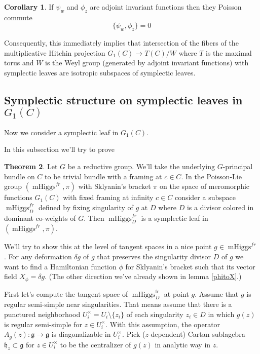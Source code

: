 \documentclass[11pt, oneside, reqno]{amsart}
\theoremstyle{definition} \newtheorem{definition}{Definition}[section]
\newtheorem{theorem}[definition]{Theorem}
\newtheorem{corollary}[definition]{Corollary}
\theoremstyle{definition} \newtheorem{remark}[definition]{Remark}
\theoremstyle{definition} \newtheorem{remarks}[definition]{Remarks}
\theoremstyle{definition} \newtheorem{question}[definition]{Question}
\theoremstyle{definition} \newtheorem*{note}{Note}
\theoremstyle{definition} \newtheorem{example}[definition]{Example}
\theoremstyle{definition} \newtheorem{examples}[definition]{Examples}
\renewcommand{\gg}{\mathfrak{g}}
\DeclareMathOperator{\mhiggs}{mHiggs}
\newcommand{\fr}{\mathrm{fr}}
\begin{document}
\begin{corollary}\label{cor:poisson-commuting}
  If $\psi_{w}$ and $\phi_{z}$ are adjoint invariant functions then they Poisson commute 
  \begin{equation}
    \{ \psi_{w}, \phi_{z} \} = 0
  \end{equation}
\end{corollary}

Consequently, this immediately implies that intersection
of the fibers of the multiplicative Hitchin
projection $G_1(C) \to T(C)/W$ where $T$ is the maximal torus and $W$ is the Weyl group (generated
by adjoint invariant functions) with symplectic leaves are isotropic subspaces of symplectic leaves.





\subsection{Symplectic structure on symplectic leaves in $G_1(C)$}

Now we consider a symplectic leaf in $G_1(C)$. 

In this subsection we'll try to prove
\begin{theorem}\label{theorem:symplectic_leaf}
  Let $G$ be a reductive group. We'll take the underlying $G$-principal bundle on $C$
  to be trivial bundle with a framing at $c \in C$. 
In the Poisson-Lie group $(\mhiggs^{fr}, \pi)$ with Sklyanin's bracket $\pi$
on the space of meromorphic functions $G_1(C)$ with fixed framing at infinity $c \in C$
consider a subspace  $\mhiggs^{fr}_{D}$
defined 
  by fixing singularity of $g$ at $D$ where $D$ is a divisor colored in dominant co-weights of $G$. Then $\mhiggs^{fr}_{D}$ is a symplectic leaf in $(\mhiggs^{fr}, \pi)$. 
\end{theorem}

We'll try to show this at the level of tangent spaces in a nice point $g \in \mhiggs^{fr}$.  For any deformation $\delta g $ of $g$ that
preserves the singularity divisor $D$ of $g$ we want to find a Hamiltonian
function $\phi$ for Sklyanin's bracket such that its vector field
$X_\phi = \delta g$.  (The other direction we've already shown in lemma \ref{phitoX}.)


First let's compute the tangent space of $\mhiggs_{D}^{\fr}$ at point $g$.
Assume that $g$ is regular semi-simple near singularities. That means assume
that there is a punctured neighborhood $U_i^{\times} = U_{i} \setminus \{z_i \}$ of each singularity $z_i \in D $ in which $g(z)$ is regular semi-simple for $z \in U_{i}^{\times}$. 
With this assumption, the operator $A_{g}(z): \gg \to \gg$ is diagonalizable in $U_{i}^{\times}$.
\newcommand{\hh}{\mathfrak{h}}
Pick ($z$-dependent) Cartan sublagebra $\hh_{z} \subset \gg$  for $z \in U_{i}^{\times}$
to be the centralizer of $g(z)$ in analytic way in $z$. 
\end{document}
